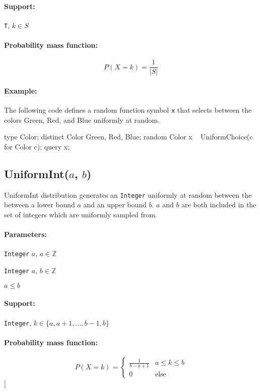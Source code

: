 \paragraph*{Support:} \verb|T|, $k \in S$ 

\paragraph*{Probability mass function:}
\[
	P(X = k) = \frac{1}{|S|}
\]

\paragraph*{Example:}
The following code defines a random function symbol \verb|x| that selects between the colors Green, Red, and Blue uniformly at random.

\begin{blogcode}
type Color;
distinct Color Green, Red, Blue;
random Color x ~ UniformChoice({c for Color c});
query x;
\end{blogcode}

\subsection{UniformInt($a$, $b$)} \label{uniformint-section}
UniformInt distribution generates an \verb|Integer| uniformly at random between the between a lower bound $a$ and an upper bound $b$. $a$ and $b$ are both included in the set of integers which are uniformly sampled from.

\paragraph*{Parameters:} 
\begin{itemize*}
\item[] \verb|Integer| $a$, $a \in \mathbb{Z}$
\item[] \verb|Integer| $a$, $b \in \mathbb{Z}$
\item[] $a \leq b$
 
\end{itemize*}

\paragraph*{Support:} \verb|Integer|, $k \in \{a, a+1, \ldots, b-1, b \}$ 

\paragraph*{Probability mass function:}
\[
	P(X = k) = \left\{
		  \begin{array}{lr}
		    \frac{1}{b - a + 1} & a \leq k \leq b \\
		    0 					& \text{else}
		  \end{array}
		\right.
\]]

